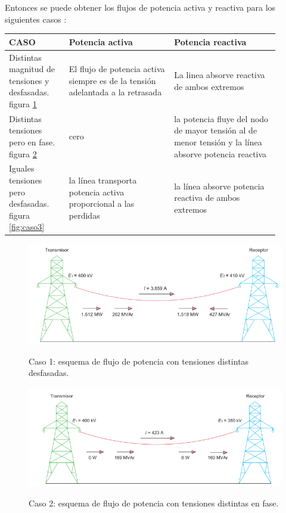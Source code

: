 \documentclass[a5paper]{book}%
\begin{document}
Entonces se puede obtener los flujos de potencia activa y reactiva
para los siguientes casos \cite{trashorras2015subestaciones}:

\begin{tabular}[H]{|p{0.2\linewidth}|p{0.35\linewidth}|p{0.35\linewidth}|}
  \hline
  CASO & Potencia \textbf{activa} & Potencia \textbf{reactiva}\\\hline
  Distintas magnitud de tensiones  y desfasadas. figura \ref{fig:caso1}  & El flujo de potencia activa siempre es de la tensión adelantada a la  retrasada& La linea absorve reactiva de ambos extremos\\\hline
  Distintas tensiones pero en fase. figura \ref{fig:caso2} & cero&la potencia fluye del nodo  de mayor tensión al de menor tensión y la línea absorve potencia reactiva  \\\hline
  Iguales tensiones pero desfasadas. figura \ref{fig:caso3}  &la línea transporta potencia activa proporcional a las perdidas &la línea absorve potencia reactiva de ambos extremos\\\hline
\end{tabular}


\begin{figure}[H]
  \centering
  \caption{Caso 1: esquema de flujo de potencia con tensiones distintas
    desfasadas.}
  \includegraphics[width=\linewidth]{caso1}
  \label{fig:caso1}
\end{figure}


\begin{figure}[H]
  \centering
  \caption{Caso 2: esquema de flujo de potencia con tensiones distintas en
    fase.}
  \includegraphics[width=\linewidth]{tensiones_distintas_igual_fase}
  \label{fig:caso2}
\end{figure}
\end{document}
